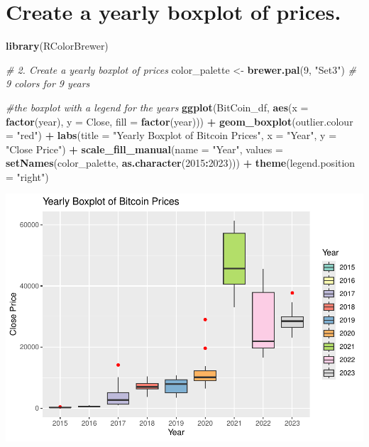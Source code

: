 \documentclass[
]{book}
\newenvironment{Shaded}{\begin{snugshade}}{\end{snugshade}}
\newcommand{\AttributeTok}[1]{\textcolor[rgb]{0.13,0.29,0.53}{#1}}
\newcommand{\CommentTok}[1]{\textcolor[rgb]{0.56,0.35,0.01}{\textit{#1}}}
\newcommand{\DecValTok}[1]{\textcolor[rgb]{0.00,0.00,0.81}{#1}}
\newcommand{\FunctionTok}[1]{\textcolor[rgb]{0.13,0.29,0.53}{\textbf{#1}}}
\newcommand{\NormalTok}[1]{#1}
\newcommand{\OtherTok}[1]{\textcolor[rgb]{0.56,0.35,0.01}{#1}}
\newcommand{\SpecialCharTok}[1]{\textcolor[rgb]{0.81,0.36,0.00}{\textbf{#1}}}
\newcommand{\StringTok}[1]{\textcolor[rgb]{0.31,0.60,0.02}{#1}}
\begin{document}
\section*{Create a yearly boxplot of prices.}\label{create-a-yearly-boxplot-of-prices.}

\begin{Shaded}
\begin{Highlighting}[]
\FunctionTok{library}\NormalTok{(RColorBrewer)}

\CommentTok{\# 2. Create a yearly boxplot of prices}
\NormalTok{color\_palette }\OtherTok{\textless{}{-}} \FunctionTok{brewer.pal}\NormalTok{(}\DecValTok{9}\NormalTok{, }\StringTok{"Set3"}\NormalTok{)  }\CommentTok{\# 9 colors for 9 years}

\CommentTok{\#the boxplot with a legend for the years}
\FunctionTok{ggplot}\NormalTok{(BitCoin\_df, }\FunctionTok{aes}\NormalTok{(}\AttributeTok{x =} \FunctionTok{factor}\NormalTok{(year), }\AttributeTok{y =}\NormalTok{ Close, }\AttributeTok{fill =} \FunctionTok{factor}\NormalTok{(year))) }\SpecialCharTok{+}
  \FunctionTok{geom\_boxplot}\NormalTok{(}\AttributeTok{outlier.colour =} \StringTok{"red"}\NormalTok{) }\SpecialCharTok{+}
  \FunctionTok{labs}\NormalTok{(}\AttributeTok{title =} \StringTok{"Yearly Boxplot of Bitcoin Prices"}\NormalTok{, }\AttributeTok{x =} \StringTok{"Year"}\NormalTok{, }\AttributeTok{y =} \StringTok{"Close Price"}\NormalTok{) }\SpecialCharTok{+}
  \FunctionTok{scale\_fill\_manual}\NormalTok{(}\AttributeTok{name =} \StringTok{"Year"}\NormalTok{, }\AttributeTok{values =} \FunctionTok{setNames}\NormalTok{(color\_palette, }\FunctionTok{as.character}\NormalTok{(}\DecValTok{2015}\SpecialCharTok{:}\DecValTok{2023}\NormalTok{))) }\SpecialCharTok{+}
  \FunctionTok{theme}\NormalTok{(}\AttributeTok{legend.position =} \StringTok{"right"}\NormalTok{)}
\end{Highlighting}
\end{Shaded}

\includegraphics{bookdown-demo_files/figure-latex/unnamed-chunk-10-1.pdf}
\end{document}
